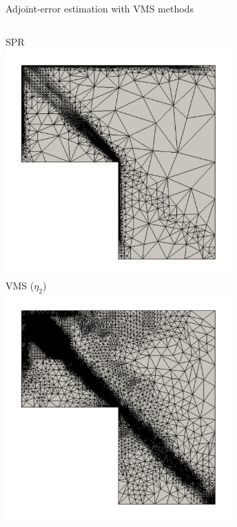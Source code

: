\documentclass[fleqn]{beamer}
\begin{document}
\begin{frame}{Adjoint-error estimation with VMS methods}
\begin{columns}
\begin{column}{0.5\textwidth}
\centering
SPR  \\
\includegraphics[width=0.65\textwidth]{../img/vms_lshape_square_spr_final.pdf}\\
VMS ($\eta_2$)\\
\includegraphics[width=0.65\textwidth]{../img/vms_lshape_square_vms2_final.pdf}
\end{column}
\end{columns}

\end{frame}

\end{document}
